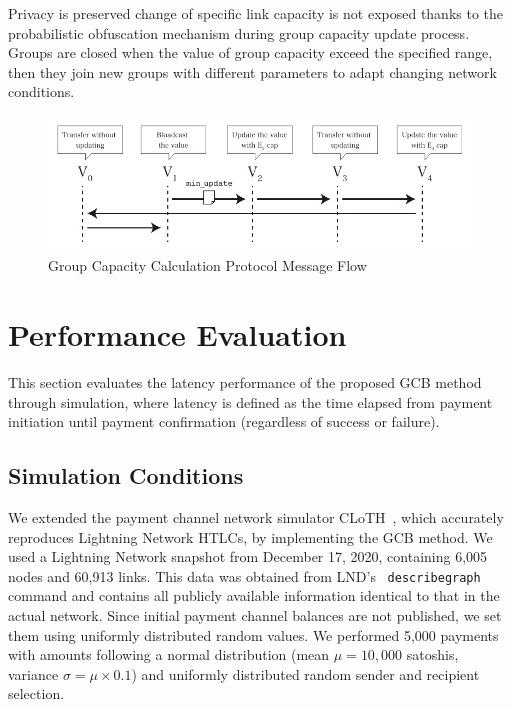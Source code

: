 \documentclass[conference]{IEEEtran}
\begin{document}
Privacy is preserved change of specific link capacity is not exposed thanks to the probabilistic obfuscation mechanism during group capacity update process.
Groups are closed when the value of group capacity exceed the specified range, then they join new groups with different parameters to adapt changing network conditions.

\begin{figure}[htbp]
	\centerline{\includegraphics[width=\linewidth]{fig/group_cap_handover}}
	\caption{Group Capacity Calculation Protocol Message Flow}
	\label{fig:group_cap_handover}
\end{figure}

\section{Performance Evaluation}

This section evaluates the latency performance of the proposed GCB method through simulation, where latency is defined as the time elapsed from payment initiation until payment confirmation (regardless of success or failure).

\subsection{Simulation Conditions}
We extended the payment channel network simulator CLoTH~\cite{CONOSCENTI2021100717}, which accurately reproduces Lightning Network HTLCs, by implementing the GCB method.
We used a Lightning Network snapshot from December 17, 2020, containing 6,005 nodes and 60,913 links.
This data was obtained from LND's~\cite{lnd} \texttt{describegraph} command and contains all publicly available information identical to that in the actual network.
Since initial payment channel balances are not published, we set them using uniformly distributed random values.
We performed 5,000 payments with amounts following a normal distribution (mean $\mu = 10,000$ satoshis, variance $\sigma = \mu \times 0.1$) and uniformly distributed random sender and recipient selection.
\end{document}
